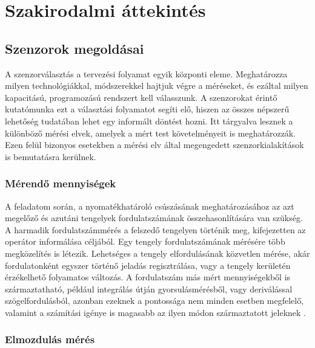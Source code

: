 \chapter{Szakirodalmi áttekintés}
\label{sec:Szakirodalom}
\section{Szenzorok megoldásai}
\label{szenzorok_szakirodalom}

A szenzorválasztás a tervezési folyamat egyik központi eleme. Meghatározza milyen technológiákkal, módszerekkel hajtjuk végre a méréseket, és ezáltal milyen kapacitású, programozású rendszert kell válasszunk. A szenzorokat érintő kutatómunka ezt a választási folyamatot segíti elő, hiszen az összes népszerű lehetőség tudatában lehet egy informált döntést hozni. Itt tárgyalva lesznek a különböző mérési elvek, amelyek a mért test követelményeit is meghatározzák. Ezen felül bizonyos esetekben a mérési elv által megengedett szenzorkialakítások is bemutatásra kerülnek.

\subsection{Mérendő mennyiségek}

A feladatom során, a nyomatékhatároló csúszásának meghatározásához az azt megelőző és azutáni tengelyek fordulatszámának összehasonlítására van szükség. A harmadik fordulatszámmérés a felszedő tengelyen történik meg, kifejezetten az operátor informálása céljából. Egy tengely fordulatszámának mérésére több megközelítés is létezik. Lehetséges a tengely elfordulásának közvetlen mérése, akár fordulatonként egyszer történő jeladás regisztrálása, vagy a tengely kerületén érzékelhető folyamatos változás. A fordulatszám más mért mennyiségekből is származtatható, például integrálás útján gyorsulásmérésből, vagy deriválással szögelfordulásból, azonban ezeknek a pontossága nem minden esetben megfelelő, valamint a számítási igénye is magasabb az ilyen módon származtatott jeleknek \cite{Morris2016a}.

\subsection{Elmozdulás mérés}
\label{elmozd}


